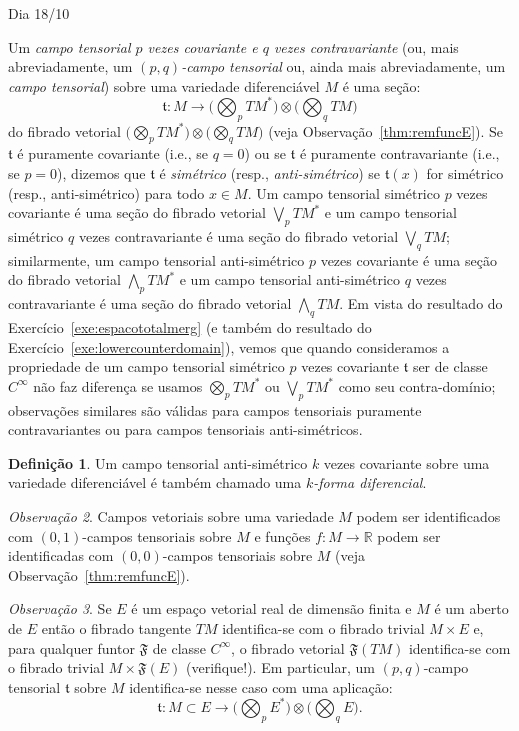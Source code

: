 \documentclass[oneside,11pt]{amsart}
\newcommand{\R}{\mathds R}
\theoremstyle{remark}\newtheorem{exercise}{Exercício}[section]
\theoremstyle{plain}\newtheorem{teo}{Teorema}[section]
\theoremstyle{plain}\newtheorem{lem}[teo]{Lema}
\theoremstyle{plain}\newtheorem{prop}[teo]{Proposição}
\theoremstyle{definition}\newtheorem{defin}[teo]{Definição}
\theoremstyle{remark}\newtheorem{rem}[teo]{Observação}
\theoremstyle{definition}\newtheorem{example}[teo]{Exemplo}
\numberwithin{equation}{section}
\begin{document}
\begin{section}{Dia 18/10}

Um {\em campo tensorial $p$ vezes covariante e $q$ vezes contravariante}
(ou, mais abreviadamente, um {\em $(p,q)$-campo tensorial\/} ou, ainda mais abreviadamente, um {\em campo tensorial}) sobre uma variedade diferenciável
$M$ é uma seção:
\[\mathfrak t:M\longrightarrow\Big(\bigotimes_pTM^*\Big)\otimes\Big(\bigotimes_qTM\Big)\]
do fibrado vetorial $\big(\bigotimes_pTM^*\big)\otimes\big(\bigotimes_qTM\big)$ (veja Observação~\ref{thm:remfuncE}). Se $\mathfrak t$ é puramente covariante
(i.e., se $q=0$) ou se $\mathfrak t$ é puramente contravariante (i.e., se $p=0$), dizemos
que $\mathfrak t$ é {\em simétrico\/} (resp., {\em anti-simétrico}) se $\mathfrak t(x)$ for simétrico (resp., anti-simétrico) para todo $x\in M$.
Um campo tensorial simétrico $p$ vezes covariante é uma seção do fibrado vetorial $\bigvee_pTM^*$ e um campo tensorial simétrico $q$ vezes contravariante
é uma seção do fibrado vetorial $\bigvee_qTM$; similarmente, um campo tensorial anti-simétrico $p$ vezes covariante é uma seção do fibrado vetorial
$\bigwedge_pTM^*$ e um campo tensorial anti-simétrico $q$ vezes contravariante é uma seção do fibrado vetorial $\bigwedge_qTM$. Em vista
do resultado do Exercício~\ref{exe:espacototalmerg} (e também do resultado do Exercício~\ref{exe:lowercounterdomain}), vemos que quando consideramos
a propriedade de um campo tensorial simétrico $p$ vezes covariante $\mathfrak t$ ser de classe $C^\infty$ não faz diferença se usamos $\bigotimes_pTM^*$
ou $\bigvee_pTM^*$ como seu contra-domínio; observações similares são válidas para campos tensoriais puramente contravariantes ou para campos tensoriais anti-simétricos.


\begin{defin}
Um campo tensorial anti-simétrico $k$ vezes covariante sobre uma variedade diferenciável é também chamado uma {\em $k$-forma diferencial}.
\end{defin}

\begin{rem}
Campos vetoriais sobre uma variedade $M$ podem ser identificados com $(0,1)$-campos tensoriais sobre $M$ e funções $f:M\to\R$ podem
ser identificadas com $(0,0)$-campos tensoriais sobre $M$ (veja Observação~\ref{thm:remfuncE}).
\end{rem}

\begin{rem}
Se $E$ é um espaço vetorial real de dimensão finita e $M$ é um aberto de $E$ então o fibrado tangente $TM$ identifica-se com o fibrado trivial
$M\times E$ e, para qualquer funtor $\mathfrak F$ de classe $C^\infty$, o fibrado vetorial $\mathfrak F(TM)$ identifica-se com o fibrado trivial
$M\times\mathfrak F(E)$ (verifique!). Em particular, um $(p,q)$-campo tensorial $\mathfrak t$ sobre $M$ identifica-se nesse caso com uma aplicação:
\[\mathfrak t:M\subset E\longrightarrow\Big(\bigotimes_pE^*\Big)\otimes\Big(\bigotimes_qE\Big).\]
\end{rem}


\end{section}
\end{document}
